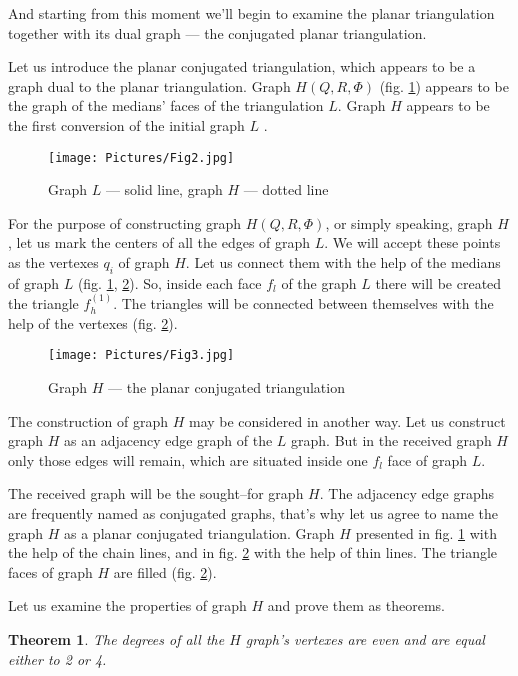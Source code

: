 \documentclass{amsart}
\newtheorem{theorem}{Theorem}
\theoremstyle{plain}
\numberwithin{equation}{section}
\begin{document}
And starting from this moment we'll begin to examine the planar triangulation together with its dual graph --- the conjugated planar triangulation.

Let us introduce the planar conjugated triangulation, which appears to be a graph dual to the planar triangulation. Graph $H(Q,R,\Phi)$ (fig. \ref{Fig:2}) appears to be the graph of the medians' faces of the triangulation $L$. Graph $H$ appears to be the first conversion of the initial graph $L$ \cite {Malinin}.

\begin{figure}[htb]
	\texttt{[image: Pictures/Fig2.jpg]}
	\caption{Graph $L$ --- solid line, graph $H$ --- dotted line}
	\label{Fig:2}
\end{figure}

For the purpose of constructing graph $H(Q,R,\Phi)$, or simply speaking, graph $H$, let us mark the centers of all the edges of graph $L$. We will accept these points as the vertexes $q_i$ of graph $H$. Let us connect them with the help of the medians of graph $L$ (fig. \ref{Fig:2}, \ref{Fig:3}). So, inside each face $f_l$ of the graph $L$ there will be created the triangle $f_h^{(1)}$. The triangles will be connected between themselves with the help of the vertexes (fig. \ref{Fig:3}).

\begin{figure}[htb]
	\texttt{[image: Pictures/Fig3.jpg]}
	\caption{Graph $H$ --- the planar conjugated triangulation}
	\label{Fig:3}
\end{figure}

The construction of graph $H$ may be considered in another way. Let us construct graph $H$ as an adjacency edge graph of the $L$ graph. But in the received graph $H$ only those edges will remain, which are situated inside one $f_l$ face of graph $L$.

The received graph will be the sought--for graph $H$. 
The adjacency edge graphs are frequently named as conjugated graphs, that's why let us agree to name the graph $H$ as a planar conjugated triangulation. Graph $H$ presented in fig. \ref{Fig:2} with the help of the chain lines, and in fig. \ref{Fig:3} with the help of thin lines. The triangle faces of graph $H$ are filled (fig. \ref{Fig:3}).

Let us examine the properties of graph $H$ and prove them as theorems.

\begin{theorem}
The degrees of all the $H$ graph's vertexes are even and are equal either to 2 or 4.
\end {theorem}
\end{document}
